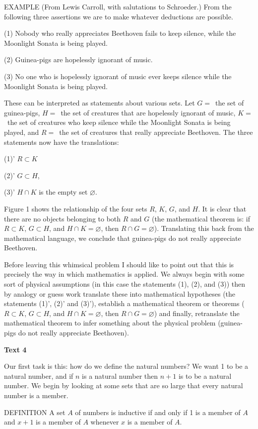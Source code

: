 \documentclass[a4paper]{article}
\newcommand{\ESect}[1]{\medskip\par{\large \textbf{#1}}\par}
\begin{document}
EXAMPLE (From Lewis Carroll, with salutations to Schroeder.) From the following three assertions we are to make whatever
deductions are possible.

(1) Nobody who really appreciates Beethoven fails to keep silence, while the Moonlight Sonata is being played.

(2) Guinea-pigs are hopelessly ignorant of music.

(3) No one who is hopelessly ignorant of music ever keeps silence while the Moonlight Sonata is being played.

These can be interpreted as statements about various sets. Let $G=$~the set of guinea-pigs, $H=$~the set of creatures that
are hopelessly ignorant of music, $K=$~the set of creatures who keep silence while the Moonlight Sonata is being played,
and $R=$~the set of creatures that really appreciate Beethoven. The three statements now have the translations:

(1)' $R \subset K$

(2)' $G \subset H$,

(3)' $H \cap K$ is the empty set $\varnothing$.

Figure 1 shows the relationship of the four sets $R$, $K$, $G$, and $H$. It is clear that there are no objects belonging
to both $R$ and $G$ (the mathematical theorem is: if $R \subset K$, $G \subset H$, and $H \cap K = \varnothing$, then
$R \cap G = \varnothing$). Translating this back from the mathematical language, we conclude that guinea-pigs do not
really appreciate Beethoven.

Before leaving this whimsical problem I should like to point out that this is precisely the way in which mathematics is
applied. We always begin with some sort of physical assumptions (in this case the statements (1), (2), and (3)) then by
analogy or guess work translate these into mathematical hypotheses (the statements (1)', (2)' and (3)'), establish a
mathematical theorem or theorems ($R \subset K$, $G \subset H$, and $H \cap K = \varnothing$, then
$R \cap G = \varnothing$) and finally, retranslate the mathematical theorem to infer something about the physical problem
(guinea-pigs do not really appreciate Beethoven).

\ESect{Text 4}
Our first task is this: how do we define the natural numbers? We want 1 to be a natural number, and if $n$ is a natural
number then $n + 1$ is to be a natural number. We begin by looking at some sets that are so large that every natural number
is a member.

DEFINITION A set $A$ of numbers is inductive if and only if 1 is a member of $A$ and $x + 1$ is a member of $A$ whenever
$x$ is a member of $A$.
\end{document}
